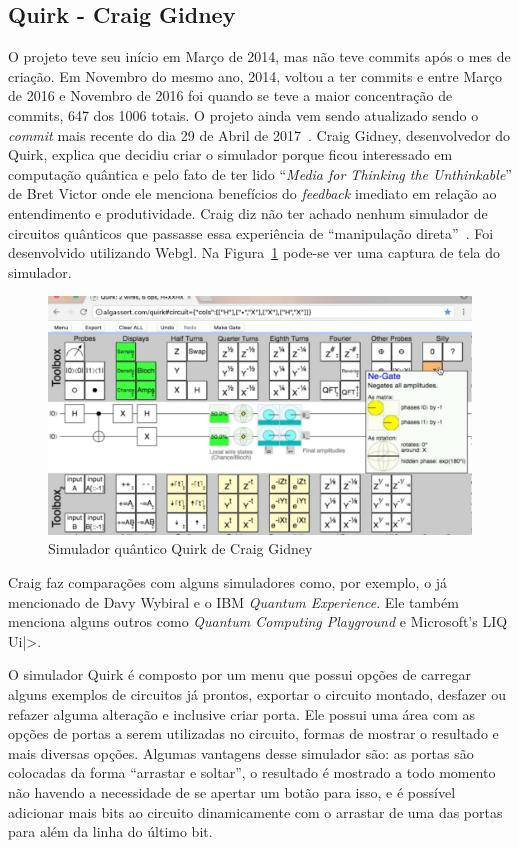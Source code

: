 \documentclass[a4paper, 12pt, oneside]{book}
\begin{document}
\subsection{Quirk - Craig Gidney}

O projeto teve seu início em Março de 2014, mas não teve commits após o mes de criação. Em Novembro do mesmo ano, 2014, voltou a ter commits e entre Março de 2016 e Novembro de 2016 foi quando se teve a maior concentração de commits, 647 dos 1006 totais. O projeto ainda vem sendo atualizado sendo o \textit{commit} mais recente do dia 29 de Abril de 2017~\cite{gitquirk}. Craig Gidney, desenvolvedor do Quirk, explica que decidiu criar o simulador porque ficou interessado em computação quântica e pelo fato de ter lido ``\textit{Media for Thinking the Unthinkable}'' de Bret Victor onde ele menciona benefícios do \textit{feedback} imediato em relação ao entendimento e produtividade. Craig diz não ter achado nenhum simulador de circuitos quânticos que passasse essa experiência de ``manipulação direta''~\cite{quirk}. Foi desenvolvido utilizando Webgl. Na Figura~\ref{fig:quirk} pode-se ver uma captura de tela do simulador.

\begin{figure}[hbtp]
\centering
\includegraphics[scale=0.36]{quirk.jpg}
\caption{Simulador quântico Quirk de Craig Gidney}
\label{fig:quirk}
\end{figure}

Craig faz comparações com alguns simuladores como, por exemplo, o já mencionado de Davy Wybiral e o IBM \textit{Quantum Experience}. Ele também menciona alguns outros como \textit{Quantum Computing Playground} e Microsoft's LIQ Ui|>.

O simulador Quirk é composto por um menu que possui opções de carregar alguns exemplos de circuitos já prontos, exportar o circuito montado, desfazer ou refazer alguma alteração e inclusive criar porta. Ele possui uma área com as opções de portas a serem utilizadas no circuito, formas de mostrar o resultado e mais diversas opções. Algumas vantagens desse simulador são: as portas são colocadas da forma ``arrastar e soltar'', o resultado é mostrado a todo momento não havendo a necessidade de se apertar um botão para isso, e é possível adicionar mais bits ao circuito dinamicamente com o arrastar de uma das portas para além da linha do último bit.
\end{document}
